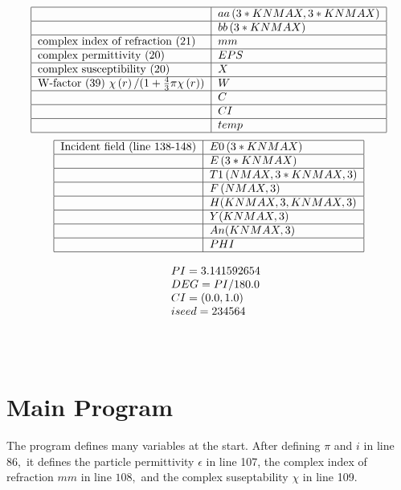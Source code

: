 \documentclass{article}
\begin{document}
\[
\begin{tabular}{|l|l|}
\hline
& $aa\left( 3\ast KNMAX,3\ast KNMAX\right) $ \\ \hline
& $bb\left( 3\ast KNMAX\right) $ \\ \hline
complex index of refraction (21) & $mm$ \\ \hline
complex permittivity (20) & $EPS$ \\ \hline
complex susceptibility (20) & $X$ \\ \hline
W-factor (39) $\chi \left( r\right) /(1+\frac{4}{3}\pi \chi \left( r\right)
) $ & $W$ \\ \hline
& $C$ \\ \hline
& $CI$ \\ \hline
& $temp$ \\ \hline
\end{tabular}%
\]%
\[
\begin{tabular}{|l|l|}
\hline
Incident field (line 138-148) & $E0\left( 3\ast KNMAX\right) $ \\ \hline
& $E\left( 3\ast KNMAX\right) $ \\ \hline
& $T1\left( NMAX,3\ast KNMAX,3\right) $ \\ \hline
& $F\left( NMAX,3\right) $ \\ \hline
& $H(KNMAX,3,KNMAX,3)$ \\ \hline
& $Y(KNMAX,3)$ \\ \hline
& $An(KNMAX,3)$ \\ \hline
& $PHI$ \\ \hline
\end{tabular}%
\]

\[
\begin{tabular}{ll}
& $PI=3.141592654$ \\ 
& $DEG=PI/180.0$ \\ 
& $CI=(0.0,1.0)$ \\ 
& $iseed=234564$ \\ 
&  \\ 
&  \\ 
& 
\end{tabular}%
\]

\section{Main Program}

The program defines many variables at the start. After defining $\pi $ and $%
i $ in line $86,$ it defines the particle permittivity $\epsilon $ in line
107, the complex index of refraction $mm$ in line $108,$ and the complex
suseptability $\chi $ in line 109.
\end{document}
